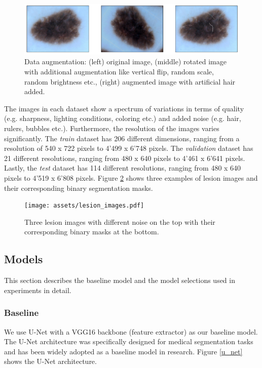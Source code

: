 \begin{figure}[ht]
  \centering
  \includegraphics[width=\columnwidth]{assets/data_augmentation.pdf}
  \caption[Datasets]
  {Data augmentation: (left) original image, (middle) rotated image with additional augmentation like vertical flip, random scale, random brightness etc., (right) augmented image with artificial hair added.}
  \label{data_augmentation}
\end{figure}

The images in each dataset show a spectrum of variations in terms of quality (e.g. sharpness, lighting conditions, coloring etc.) and added noise (e.g. hair, rulers, bubbles etc.). Furthermore, the resolution of the images varies significantly. The \emph{train} dataset has 206 different dimensions, ranging from a resolution of 540 x 722 pixels to 4'499 x 6'748 pixels. The \emph{validation} dataset has 21 different resolutions, ranging from 480 x 640 pixels to 4'461 x 6'641 pixels. Lastly, the \emph{test} dataset has 114 different resolutions, ranging from 480 x 640 pixels to 4'519 x 6'808 pixels. Figure \ref{lesion_images} shows three examples of lesion images and their corresponding binary segmentation masks.

\begin{figure}[ht]
  \centering
  \texttt{[image: assets/lesion\_images.pdf]}
  \caption[Lesion Images]
  {Three lesion images with different noise on the top with their corresponding binary masks at the bottom.}
  \label{lesion_images}
\end{figure}


\subsection{Models}
This section describes the baseline model and the model selections used in experiments in detail.

\subsubsection{Baseline}

We use U-Net \citep{unet-2015-ronneberger} with a VGG16 backbone (feature extractor) as our baseline model. The U-Net architecture was specifically designed for medical segmentation tasks and has been widely adopted as a baseline model in research. Figure \ref{u_net} shows the U-Net architecture.

